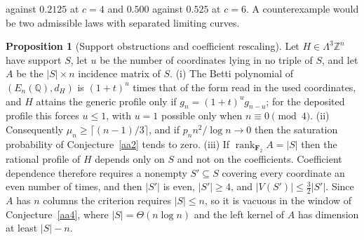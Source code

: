 \documentclass[11pt]{article}
\theoremstyle{definition}
\newcommand{\Z}{\mathbb Z}
\providecommand{\Z}{\mathbb Z}
\newtheorem{proposition}{Proposition}
\begin{document}
against $0.2125$ at $c=4$ and $0.500$ against $0.525$ at $c=6$.  A counterexample would be two admissible laws with separated limiting curves.

\begin{proposition}[Support obstructions and coefficient rescaling]\label{aa:support}
Let $H\in\Lambda^3\Z^n$ have support $S$, let $u$ be the number of coordinates lying in no triple of $S$, and let $A$ be the $|S|\times n$ incidence matrix of $S$.
(i) The Betti polynomial of $(E_n(\mathbb Q),d_H)$ is $(1+t)^{u}$ times that of the form read in the used coordinates, and $H$ attains the generic profile only if $g_n=(1+t)^{u}g_{n-u}$; for the deposited profile this forces $u\le1$, with $u=1$ possible only when $n\equiv0\pmod4$.
(ii) Consequently $\mu_n\ge\lceil(n-1)/3\rceil$, and if $p_nn^2/\log n\to0$ then the saturation probability of Conjecture~\ref{aa2} tends to zero.
(iii) If $\operatorname{rank}_{\mathbf F_2}A=|S|$ then the rational profile of $H$ depends only on $S$ and not on the coefficients.  Coefficient dependence therefore requires a nonempty $S'\subseteq S$ covering every coordinate an even number of times, and then $|S'|$ is even, $|S'|\ge4$, and $|V(S')|\le\tfrac32|S'|$.  Since $A$ has $n$ columns the criterion requires $|S|\le n$, so it is vacuous in the window of Conjecture~\ref{aa4}, where $|S|=\Theta(n\log n)$ and the left kernel of $A$ has dimension at least $|S|-n$.
\end{proposition}
\end{document}

